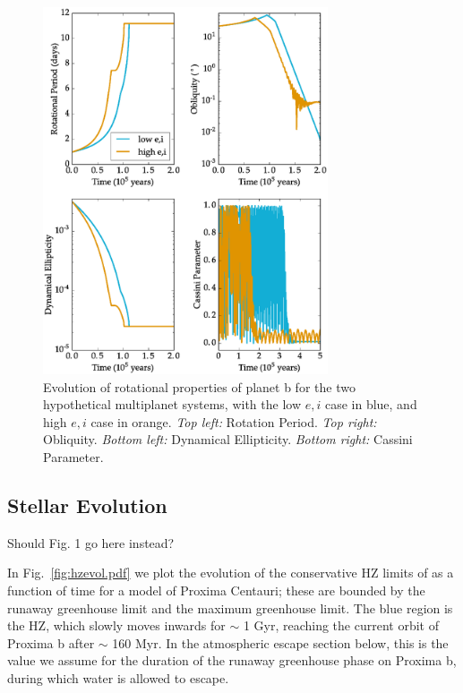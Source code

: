 \documentclass[preprint,12pt]{aastex}
\newcommand{\xxx}[1]{{\color{red} #1}} %
\begin{document}
\begin{figure} 
\begin{center}
\includegraphics[width=0.75\textwidth]{MultiSpins2.eps}
\end{center}
\caption{Evolution of rotational properties of planet b for the two hypothetical multiplanet systems, with the low $e,i$ case in blue, and high $e,i$ case in orange. {\it Top left:} Rotation Period. {\it Top right:} Obliquity. {\it Bottom left:} Dynamical Ellipticity. {\it Bottom right:} Cassini Parameter.}
\label{fig:MultiSpins}
\end{figure}




\subsection{Stellar Evolution}
\label{sec:results:stellar}

\xxx{Should Fig. 1 go here instead?}

In Fig.~\ref{fig:hzevol.pdf} we plot the evolution of the conservative HZ
limits of \cite{Kopparapu13} as a function of time for a model of
Proxima Centauri; these are bounded by the runaway greenhouse limit
and the maximum greenhouse limit. The blue region is the HZ, which
slowly moves inwards for $\sim$ 1 Gyr, reaching the current orbit of
Proxima b after $\sim$ 160 Myr. In the atmospheric escape section
below, this is the value we assume for the duration of the runaway
greenhouse phase on Proxima b, during which water is allowed to
escape.
\end{document}
